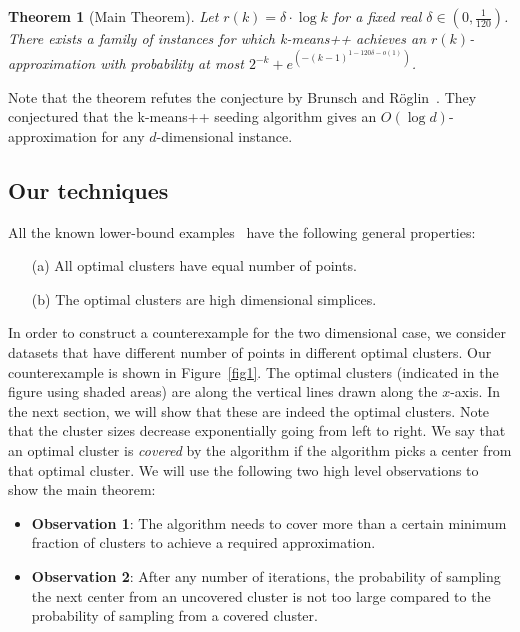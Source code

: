 \documentclass[11pt]{article}
\newtheorem{theorem}{Theorem}
\begin{document}
\begin{theorem}[Main Theorem]\label{thm:main}
Let $r(k) = \delta \cdot \log{k}$ for a fixed real $\delta \in (0,\frac{1}{120})$. 
There exists a family of instances for which k-means++ achieves an $r(k)$-approximation with probability at most $2^{-k } + e^{\left(-(k-1)^{1- 120 \delta- o(1)}\right)}$.
\end{theorem}

Note that the theorem refutes the conjecture by Brunsch and R\"{o}glin~\cite{br12}.
They conjectured that the k-means++ seeding algorithm gives an $O(\log{d})$-approximation for any $d$-dimensional instance.

\subsection{Our techniques}
All the known lower-bound examples~\cite{ArthurV07,AggarwalDK09,br12} have the following general properties:
\begin{enumerate}
\item[(a)] All optimal clusters have equal number of points.
\item[(b)] The optimal clusters are high dimensional simplices.
\end{enumerate}
In order to construct a counterexample for the two dimensional case, we consider datasets that have different number of points in different optimal clusters. 
Our counterexample is shown in Figure~\ref{fig1}.
The optimal clusters (indicated in the figure using shaded areas) are along the vertical lines drawn along the $x$-axis.
In the next section, we will show that these are indeed the optimal clusters.
Note that the cluster sizes decrease exponentially going from left to right.
We say that an optimal cluster is {\em covered} by the algorithm if the algorithm picks a center from that optimal cluster.
We will use the following two high level observations to show the main theorem:
\begin{itemize}
\item {\bf Observation 1}: The algorithm needs to cover more than a certain minimum fraction of clusters to achieve a required approximation.

\item {\bf Observation 2}: After any number of iterations, the probability of sampling the next center from an uncovered cluster is not too large compared to the probability of sampling from a covered cluster.
\end{itemize}
\end{document}
